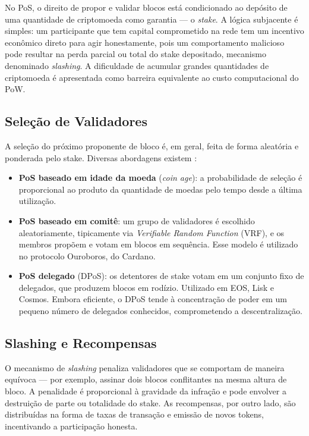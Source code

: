 \documentclass[12pt,a4paper]{report}
\begin{document}
No PoS, o direito de propor e validar blocos está condicionado ao depósito de uma quantidade de criptomoeda como garantia --- o \textit{stake}. A lógica subjacente é simples: um participante que tem capital comprometido na rede tem um incentivo econômico direto para agir honestamente, pois um comportamento malicioso pode resultar na perda parcial ou total do stake depositado, mecanismo denominado \textit{slashing}. A dificuldade de acumular grandes quantidades de criptomoeda é apresentada como barreira equivalente ao custo computacional do PoW.

\subsection{Seleção de Validadores}

A seleção do próximo proponente de bloco é, em geral, feita de forma aleatória e ponderada pelo stake. Diversas abordagens existem \cite{Bashir2023}:

\begin{itemize}
    \item \textbf{PoS baseado em idade da moeda} (\textit{coin age}): a probabilidade de seleção é proporcional ao produto da quantidade de moedas pelo tempo desde a última utilização.
    \item \textbf{PoS baseado em comitê}: um grupo de validadores é escolhido aleatoriamente, tipicamente via \textit{Verifiable Random Function} (VRF), e os membros propõem e votam em blocos em sequência. Esse modelo é utilizado no protocolo Ouroboros, do Cardano.
    \item \textbf{PoS delegado} (DPoS): os detentores de stake votam em um conjunto fixo de delegados, que produzem blocos em rodízio. Utilizado em EOS, Lisk e Cosmos. Embora eficiente, o DPoS tende à concentração de poder em um pequeno número de delegados conhecidos, comprometendo a descentralização.
\end{itemize}

\subsection{Slashing e Recompensas}

O mecanismo de \textit{slashing} penaliza validadores que se comportam de maneira equívoca --- por exemplo, assinar dois blocos conflitantes na mesma altura de bloco. A penalidade é proporcional à gravidade da infração e pode envolver a destruição de parte ou totalidade do stake. As recompensas, por outro lado, são distribuídas na forma de taxas de transação e emissão de novos tokens, incentivando a participação honesta.
\end{document}
